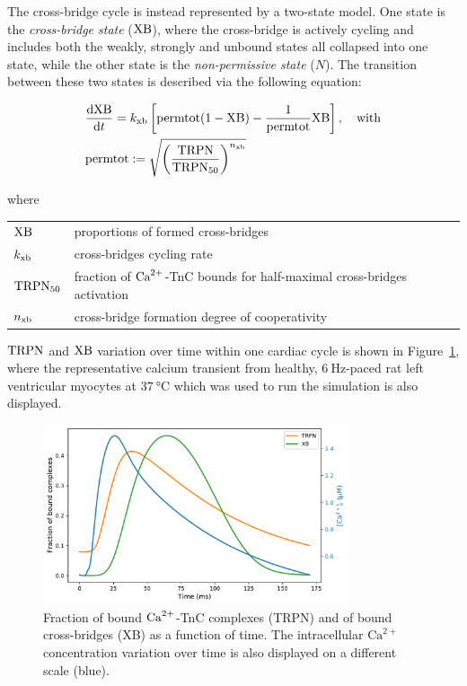 \vspace{0.3cm}
The cross-bridge cycle is instead represented by a two-state model. One state is the \textit{cross-bridge state} ($\textrm{XB}$), where the cross-bridge is actively cycling and includes both the weakly, strongly and unbound states all collapsed into one state, while the other state is the \textit{non-permissive state} ($N$). The transition between these two states is described via the following equation:

\begin{align}\label{eq:landodesys2}
    & \dfrac{\mathrm{d}{\textrm{XB}}}{\mathrm{d}{t}} = k_{\textrm{xb}}\left[\textrm{permtot}(1-\textrm{XB})-\frac{1}{\textrm{permtot}}\textrm{XB}\right],\quad\text{with} \\
    & \textrm{permtot} := \sqrt{\left(\frac{\textrm{TRPN}}{\textrm{TRPN}_{50}}\right)^{n_{\textrm{xb}}}} \nonumber
\end{align}

\noindent
where

\vspace{0.2cm}
\begin{tabular}{ll}
    $\textrm{XB}$    & proportions of formed cross-bridges \\
    $k_{\textrm{xb}}$   & cross-bridges cycling rate \\
    $\textrm{TRPN}_{50}$ & fraction of $\textrm{Ca}^{2+}$-TnC bounds for half-maximal cross-bridges activation \\
    $n_{\textrm{xb}}$   & cross-bridge formation degree of cooperativity
\end{tabular}

\vspace{0.3cm}\noindent
$\textrm{TRPN}$ and $\textrm{XB}$ variation over time within one cardiac cycle is shown in Figure~\ref{fig:catrpnxb}, where the representative calcium
transient from healthy, $\SI{6}{\hertz}$-paced rat left ventricular myocytes at $\SI{37}{\celsius}$ which was used to run the simulation is also displayed.

\begin{figure}[!ht]
    \myfloatalign
    \includegraphics[width=0.8\textwidth]{figures/chapter02/Ca_TRPN_XB.pdf}
    \caption{Fraction of bound $\textrm{Ca}^{2+}$-TnC complexes (TRPN) and of bound cross-bridges (XB) as a function of time. The intracellular $\textrm{Ca}^{2+}$ concentration variation over time is also displayed on a different scale (blue).}
    \label{fig:catrpnxb}
\end{figure}

